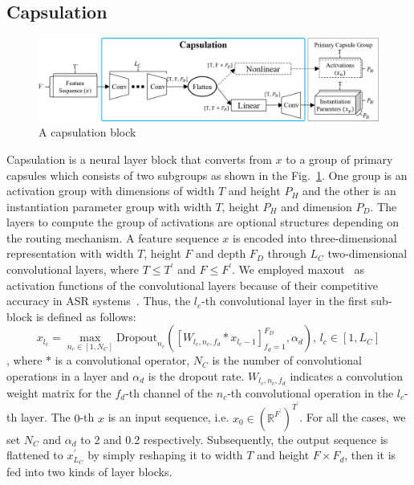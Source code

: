 \documentclass[review]{elsarticle}
\begin{document}
\subsection{Capsulation}
\begin{figure}[hbt!]
  \centering
  \includegraphics[trim={0 0cm 0 0cm}, clip, width=1.0\linewidth]{02_capsulation.jpg}
  \caption{A capsulation block}
  \label{fig:capsulation}
\end{figure}
Capsulation is a neural layer block that converts from $x$ to a group of primary capsules which consists of two subgroups as shown in the Fig.~\ref{fig:capsulation}.
One group is an activation group with dimensions of width $T$ and height $P_H$ and 
the other is an instantiation parameter group with width $T$, height $P_H$ and dimension $P_D$. 
The layers to compute the group of activations are optional structures depending on the routing mechanism.
A feature sequence $x$ is encoded into three-dimensional representation with width $T$, height $F$ and depth $F_D$ through $L_C$ two-dimensional convolutional layers, where $T \leq T^\prime$ and $F \leq F^\prime$.
We employed maxout~\citep{DBLP:journals/corr/abs-1302-4389} as activation functions of the convolutional layers because of their competitive accuracy in ASR systems~\citep{DBLP:conf/interspeech/ZhangPBZLBC16}.
Thus, the \(l_c\)-th convolutional layer in the first sub-block is defined as follows:
\begin{equation}
x_{l_c}=\max_{n_c \in [1, N_C]} \text{Dropout}_{n_c}([W_{l_c, n_c, f_d}*x_{l_c-1}]_{f_d=1}^{F_D}, \alpha_d)\text{, }l_c \in [1, L_C]
\label{eq:maxout}
\end{equation}
, where $*$ is a convolutional operator, $N_C$ is the number of convolutional operations in a layer and $\alpha_d$ is the dropout rate. $W_{l_c, n_c, f_d}$ indicates a convolution weight matrix for the $f_d$-th channel of the $n_c$-th convolutional operation in the $l_c$-th layer.
The $0$-th $x$ is an input sequence, i.e. $x_0 \in (\mathbb{R}^{F^\prime})^{T^\prime}$.
For all the cases, we set $N_C$ and $\alpha_d$ to 2 and 0.2 respectively.
Subsequently, the output sequence is flattened to $x^\prime_{L_C}$ by simply reshaping it to width $T$ and height $F \times F_d$, then it is fed into two kinds of layer blocks.
\end{document}
